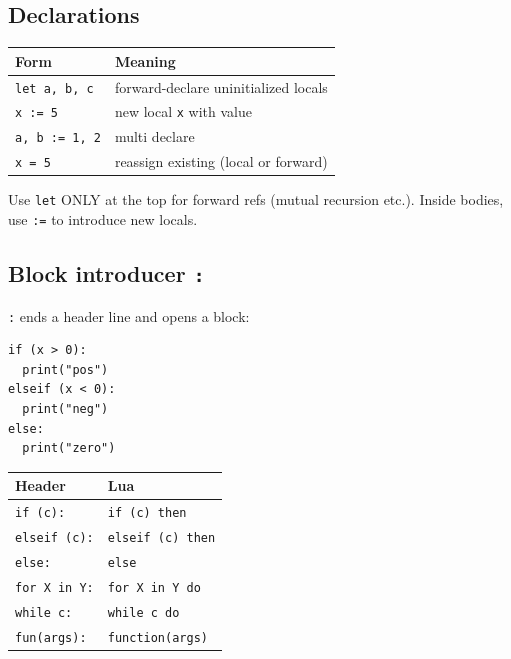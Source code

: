 \documentclass[10pt,twocolumn]{article}
\newcounter{none}
\providecommand{\passthrough}[1]{#1}
\begin{document}
\subsection{Declarations}\label{declarations}

{\def\LTcaptype{none} %
\begin{longtable}[]{@{}ll@{}}
\toprule\noalign{}
Form & Meaning \\
\midrule\noalign{}
\endhead
\bottomrule\noalign{}
\endlastfoot
\passthrough{\lstinline!let a, b, c!} & forward-declare uninitialized
locals \\
\passthrough{\lstinline!x := 5!} & new local \passthrough{\lstinline!x!}
with value \\
\passthrough{\lstinline!a, b := 1, 2!} & multi declare \\
\passthrough{\lstinline!x = 5!} & reassign existing (local or
forward) \\
\end{longtable}
}

Use \passthrough{\lstinline!let!} ONLY at the top for forward refs
(mutual recursion etc.). Inside bodies, use \passthrough{\lstinline!:=!}
to introduce new locals.

\subsection{\texorpdfstring{Block introducer
\texttt{:}}{Block introducer :}}\label{block-introducer}

\passthrough{\lstinline!:!} ends a header line and opens a block:

\begin{lstlisting}[language=Fun]
if (x > 0):
  print("pos")
elseif (x < 0):
  print("neg")
else:
  print("zero")
\end{lstlisting}

{\def\LTcaptype{none} %
\begin{longtable}[]{@{}ll@{}}
\toprule\noalign{}
Header & Lua \\
\midrule\noalign{}
\endhead
\bottomrule\noalign{}
\endlastfoot
\passthrough{\lstinline!if (c):!} &
\passthrough{\lstinline!if (c) then!} \\
\passthrough{\lstinline!elseif (c):!} &
\passthrough{\lstinline!elseif (c) then!} \\
\passthrough{\lstinline!else:!} & \passthrough{\lstinline!else!} \\
\passthrough{\lstinline!for X in Y:!} &
\passthrough{\lstinline!for X in Y do!} \\
\passthrough{\lstinline!while c:!} &
\passthrough{\lstinline!while c do!} \\
\passthrough{\lstinline!fun(args):!} &
\passthrough{\lstinline!function(args)!} \\
\end{longtable}
}
\end{document}

